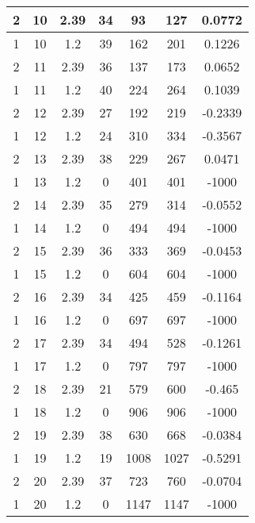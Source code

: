 \documentclass[letterpaper, 12pt]{article}
\begin{document}
\begin{longtable}{|c|c|c|c|c|c|c|}
\hline
2 & 10 & 2.39 & 34 & 93 & 127 & 0.0772 \\
\hline
1 & 10 & 1.2 & 39 & 162 & 201 & 0.1226 \\
\hline
2 & 11 & 2.39 & 36 & 137 & 173 & 0.0652 \\
\hline
1 & 11 & 1.2 & 40 & 224 & 264 & 0.1039 \\
\hline
2 & 12 & 2.39 & 27 & 192 & 219 & -0.2339 \\
\hline
1 & 12 & 1.2 & 24 & 310 & 334 & -0.3567 \\
\hline
2 & 13 & 2.39 & 38 & 229 & 267 & 0.0471 \\
\hline
1 & 13 & 1.2 & 0 & 401 & 401 & -1000 \\
\hline
2 & 14 & 2.39 & 35 & 279 & 314 & -0.0552 \\
\hline
1 & 14 & 1.2 & 0 & 494 & 494 & -1000 \\
\hline
2 & 15 & 2.39 & 36 & 333 & 369 & -0.0453 \\
\hline
1 & 15 & 1.2 & 0 & 604 & 604 & -1000 \\
\hline
2 & 16 & 2.39 & 34 & 425 & 459 & -0.1164 \\
\hline
1 & 16 & 1.2 & 0 & 697 & 697 & -1000 \\
\hline
2 & 17 & 2.39 & 34 & 494 & 528 & -0.1261 \\
\hline
1 & 17 & 1.2 & 0 & 797 & 797 & -1000 \\
\hline
2 & 18 & 2.39 & 21 & 579 & 600 & -0.465 \\
\hline
1 & 18 & 1.2 & 0 & 906 & 906 & -1000 \\
\hline
2 & 19 & 2.39 & 38 & 630 & 668 & -0.0384 \\
\hline
1 & 19 & 1.2 & 19 & 1008 & 1027 & -0.5291 \\
\hline
2 & 20 & 2.39 & 37 & 723 & 760 & -0.0704 \\
\hline
1 & 20 & 1.2 & 0 & 1147 & 1147 & -1000 \\
\hline
\end{longtable}
\end{document}
